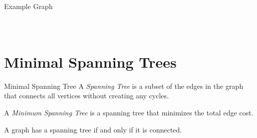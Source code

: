 \documentclass[14pt,aspectratio=1610]{beamer}
\begin{document}
\begin{frame}{Example Graph}
\begin{columns}
\begin{figure}
  \end{figure}
\end{columns}
\end{frame}

\section{Minimal Spanning Trees}

\begin{frame}{Minimal Spanning Tree}
A \emph{Spanning Tree} is a subset of the edges in the graph that connects all vertices without creating any cycles.

A \emph{Minimum Spanning Tree} is a spanning tree that minimizes the total edge cost.

A graph has a spanning tree if and only if it is connected.
\end{frame}
\end{document}
